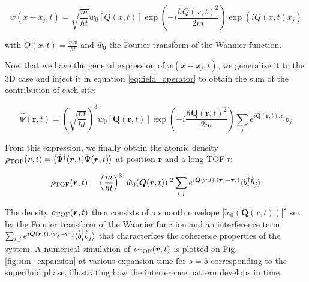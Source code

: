 \begin{equation}
    w\left(x-x_{j}, t\right)=\sqrt{\frac{m}{\hbar t}} \tilde{w_0}[Q(x,t)] \exp\left(-i \frac{\hbar Q(x,t)^{2}}{2 m} \right) \exp\left(i Q(x,t) x_{j}\right)
\end{equation}

\noindent with $Q(x,t)=\frac{m x}{\hbar t}$ and $\tilde{w_0}$ the Fourier transform of the Wannier function. 

Now that we have the general expression of $w\left(x-x_{j}, t\right)$, we generalize it to the 3D case and inject it in equation \ref{eq:field_operator} to obtain the sum of the contribution of each site:

\begin{equation}
    \hat{\Psi} (\bm{r},t) = \left(\sqrt{\frac{m}{\hbar t}} \right)^3 \tilde{w_0}[\bm{Q}(\bm{r},t)] \exp\left(-i \frac{\hbar \bm{Q}(\bm{r},t)^{2}}{2 m} \right) \sum_j e^{i \bm{Q}(\bm{r},t). \bm{r}_{j}} \hat{b}_j
\end{equation}

\noindent From this expression, we finally obtain the atomic density $\rho_{\rm{TOF}}(\bm{r},t) = \langle\hat{\Psi}^{\dagger} (\bm{r},t) \hat{\Psi} (\bm{r},t)\rangle$ at position $\bm{r}$ and a long TOF $t$:

\begin{equation}
    \rho_{\rm{TOF}}(\bm{r},t) = \left(\frac{m}{\hbar t} \right)^3 |\tilde{w}_0(\bm{Q}(\bm{r},t))|^2 \sum_{i,j} e^{i \bm{Q}(\bm{r},t).(\bm{r}_j - \bm{r}_{i})} \langle\hat{b}^{\dagger}_i \hat{b}_j \rangle
    \label{eq:rho_tof}
\end{equation}

\noindent The density $\rho_{\rm{TOF}}(\bm{r},t)$ then consists of a smooth envelope $|\tilde{w}_0(\bm{Q}(\bm{r},t))|^2$ set by the Fourier transform of the Wannier function and an interference term $\sum_{i,j} e^{i \bm{Q}(\bm{r},t).(\bm{r}_j - \bm{r}_{i})} \langle\hat{b}^{\dagger}_i \hat{b}_j \rangle$ that characterizes the coherence properties of the system. A numerical simulation of $\rho_{\rm{TOF}}(\bm{r},t)$ is plotted on Fig.-\ref{fig:sim_expansion} at various expansion time for $s=5$ corresponding to the superfluid phase, illustrating how the interference pattern develops in time.

